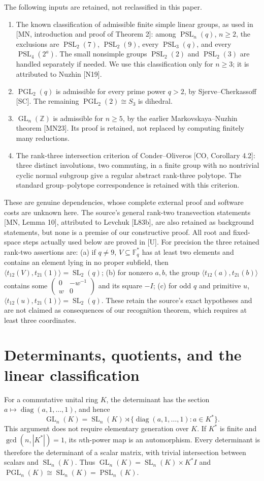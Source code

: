 \documentclass[11pt]{article}
\newcommand{\GL}{\operatorname{GL}}\newcommand{\SL}{\operatorname{SL}}
\newcommand{\PGL}{\operatorname{PGL}}\newcommand{\PSL}{\operatorname{PSL}}
\newcommand{\diag}{\operatorname{diag}}\newcommand{\F}{\mathbb F}
\begin{document}
The following inputs are retained, not reclassified in this paper.
\begin{enumerate}
\item The known classification of admissible finite simple linear groups,
as used in [MN, introduction and proof of Theorem 2]: among $\PSL_n(q)$,
$n\geq2$, the exclusions are $\PSL_2(7)$, $\PSL_2(9)$, every
$\PSL_3(q)$, and every $\PSL_4(2^a)$. The small nonsimple groups
$\PSL_2(2)$ and $\PSL_2(3)$ are handled separately if needed. We use this
classification only for $n\geq3$; it is attributed to Nuzhin [N19].
\item $\PGL_2(q)$ is admissible for every prime power $q>2$, by
Sjerve--Cherkassoff [SC]. The remaining $\PGL_2(2)\cong S_3$ is dihedral.
\item $\GL_n(\mathbb Z)$ is admissible for $n\geq5$, by the earlier
Markovskaya--Nuzhin theorem [MN23]. Its proof is retained, not replaced by
computing finitely many reductions.
\item The rank-three intersection criterion of Conder--Oliveros [CO,
Corollary 4.2]: three distinct involutions, two commuting, in a finite
group with no nontrivial cyclic normal subgroup give a regular abstract
rank-three polytope. The standard group--polytope correspondence is
retained with this criterion.
\end{enumerate}
These are genuine dependencies, whose complete external proof and
software costs are unknown here. The source's general rank-two
transvection statements [MN, Lemma 10], attributed to Levchuk [L83b], are
also retained as background statements, but none is a premise of our
constructive proof. All root and fixed-space steps actually used below
are proved in [U].
For precision the three retained rank-two assertions are: (a) if $q\ne9$,
$V\subseteq\F_q^*$ has at least two elements and contains an element
lying in no proper subfield, then $\langle t_{12}(V),t_{21}(1)\rangle
=\SL_2(q)$; (b) for nonzero $a,b$, the group
$\langle t_{12}(a),t_{21}(b)\rangle$ contains some
$\left(\begin{smallmatrix}0&-w^{-1}\\w&0\end{smallmatrix}\right)$ and
its square $-I$; (c) for odd $q$ and primitive $u$,
$\langle t_{12}(u),t_{21}(1)\rangle=\SL_2(q)$.
These retain the source's exact hypotheses and are not claimed as
consequences of our recognition theorem, which requires at least three
coordinates.

\section{Determinants, quotients, and the linear classification}
For a commutative unital ring $K$, the determinant has the section
$a\mapsto\diag(a,1,\ldots,1)$, and hence
\[\GL_n(K)=\SL_n(K)\rtimes\{\diag(a,1,\ldots,1):a\in K^*\}.\]
This argument does not require elementary generation over $K$.
If $K^*$ is finite and $\gcd(n,|K^*|)=1$, its $n$th-power map is an
automorphism. Every determinant is therefore the determinant of a scalar
matrix, with trivial intersection between scalars and $\SL_n(K)$. Thus
$\GL_n(K)=\SL_n(K)\times K^*I$ and
$\PGL_n(K)\cong\SL_n(K)=\PSL_n(K)$.
\end{document}

